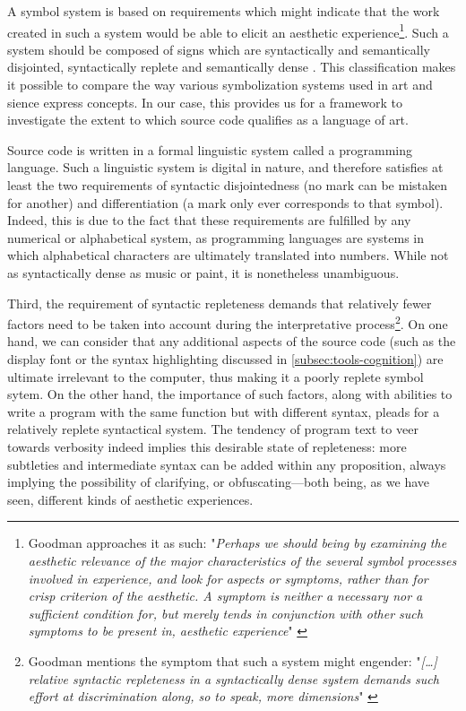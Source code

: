 A symbol system is based on requirements which might indicate that the work created in such a system would be able to elicit an aesthetic experience\footnote{Goodman approaches it as such: "\emph{Perhaps we should being by examining the aesthetic relevance of the major characteristics of the several symbol processes involved in experience, and look for aspects or symptoms, rather than for crisp criterion of the aesthetic. A symptom is neither a necessary nor a sufficient condition for, but merely tends in conjunction with other such symptoms to be present in, aesthetic experience}" \citep{goodman_languages_1976}}. Such a system should be composed of signs which are syntactically and semantically disjointed, syntactically replete and semantically dense \citep{goodman_languages_1976}. This classification makes it possible to compare the way various symbolization systems used in art and sience express concepts. In our case, this provides us for a framework to investigate the extent to which source code qualifies as a language of art.

Source code is written in a formal linguistic system called a programming language. Such a linguistic system is digital in nature, and therefore satisfies at least the two requirements of syntactic disjointedness (no mark can be mistaken for another) and differentiation (a mark only ever corresponds to that symbol). Indeed, this is due to the fact that these requirements are fulfilled by any numerical or alphabetical system, as programming languages are systems in which alphabetical characters are ultimately translated into numbers. While not as syntactically dense as music or paint, it is nonetheless unambiguous.

Third, the requirement of syntactic repleteness demands that relatively fewer factors need to be taken into account during the interpretative process\footnote{Goodman mentions the symptom that such a system might engender: "\emph{[\dots] relative syntactic repleteness in a syntactically dense system demands such effort at discrimination along, so to speak, more dimensions}" \citep{goodman_languages_1976}}. On one hand, we can consider that any additional aspects of the source code (such as the display font or the syntax highlighting discussed in \ref{subsec:tools-cognition}) are ultimate irrelevant to the computer, thus making it a poorly replete symbol sytem. On the other hand, the importance of such factors, along with abilities to write a program with the same function but with different syntax, pleads for a relatively replete syntactical system. The tendency of program text to veer towards verbosity indeed implies this desirable state of repleteness: more subtleties and intermediate syntax can be added within any proposition, always implying the possibility of clarifying, or obfuscating—both being, as we have seen, different kinds of aesthetic experiences.

